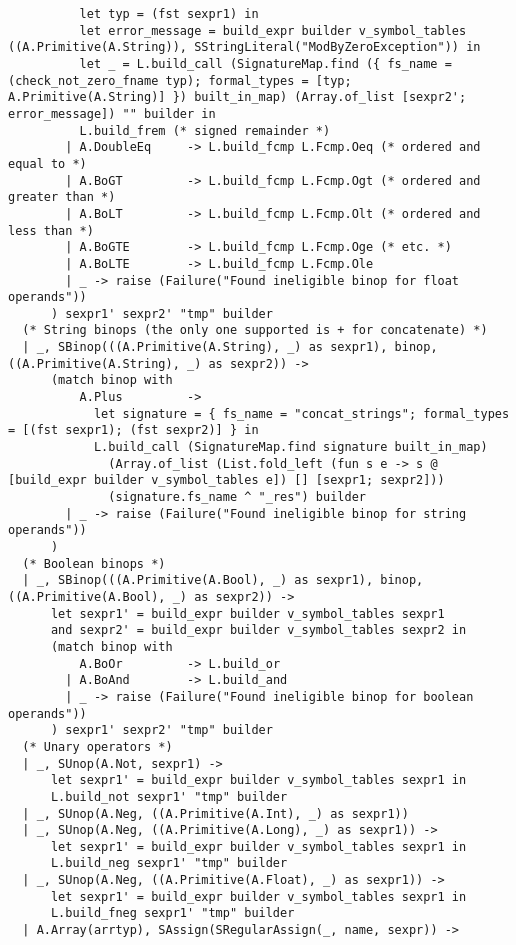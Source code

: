 \documentclass{article}
\begin{document}
\begin{verbatim}
          let typ = (fst sexpr1) in
          let error_message = build_expr builder v_symbol_tables ((A.Primitive(A.String)), SStringLiteral("ModByZeroException")) in
          let _ = L.build_call (SignatureMap.find ({ fs_name = (check_not_zero_fname typ); formal_types = [typ; A.Primitive(A.String)] }) built_in_map) (Array.of_list [sexpr2'; error_message]) "" builder in
          L.build_frem (* signed remainder *)
        | A.DoubleEq     -> L.build_fcmp L.Fcmp.Oeq (* ordered and equal to *)
        | A.BoGT         -> L.build_fcmp L.Fcmp.Ogt (* ordered and greater than *)
        | A.BoLT         -> L.build_fcmp L.Fcmp.Olt (* ordered and less than *)
        | A.BoGTE        -> L.build_fcmp L.Fcmp.Oge (* etc. *)
        | A.BoLTE        -> L.build_fcmp L.Fcmp.Ole
        | _ -> raise (Failure("Found ineligible binop for float operands"))
      ) sexpr1' sexpr2' "tmp" builder
  (* String binops (the only one supported is + for concatenate) *)
  | _, SBinop(((A.Primitive(A.String), _) as sexpr1), binop, ((A.Primitive(A.String), _) as sexpr2)) ->
      (match binop with
          A.Plus         ->
            let signature = { fs_name = "concat_strings"; formal_types = [(fst sexpr1); (fst sexpr2)] } in
            L.build_call (SignatureMap.find signature built_in_map)
              (Array.of_list (List.fold_left (fun s e -> s @ [build_expr builder v_symbol_tables e]) [] [sexpr1; sexpr2]))
              (signature.fs_name ^ "_res") builder
        | _ -> raise (Failure("Found ineligible binop for string operands"))
      )
  (* Boolean binops *)
  | _, SBinop(((A.Primitive(A.Bool), _) as sexpr1), binop, ((A.Primitive(A.Bool), _) as sexpr2)) ->
      let sexpr1' = build_expr builder v_symbol_tables sexpr1
      and sexpr2' = build_expr builder v_symbol_tables sexpr2 in
      (match binop with
          A.BoOr         -> L.build_or
        | A.BoAnd        -> L.build_and
        | _ -> raise (Failure("Found ineligible binop for boolean operands"))
      ) sexpr1' sexpr2' "tmp" builder
  (* Unary operators *)
  | _, SUnop(A.Not, sexpr1) ->
      let sexpr1' = build_expr builder v_symbol_tables sexpr1 in
      L.build_not sexpr1' "tmp" builder
  | _, SUnop(A.Neg, ((A.Primitive(A.Int), _) as sexpr1))
  | _, SUnop(A.Neg, ((A.Primitive(A.Long), _) as sexpr1)) ->
      let sexpr1' = build_expr builder v_symbol_tables sexpr1 in
      L.build_neg sexpr1' "tmp" builder
  | _, SUnop(A.Neg, ((A.Primitive(A.Float), _) as sexpr1)) ->
      let sexpr1' = build_expr builder v_symbol_tables sexpr1 in
      L.build_fneg sexpr1' "tmp" builder
  | A.Array(arrtyp), SAssign(SRegularAssign(_, name, sexpr)) ->

\end{verbatim}
\end{document}
